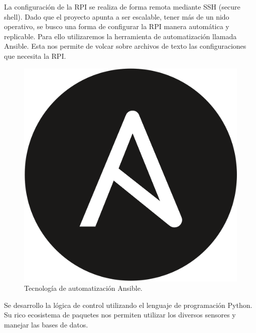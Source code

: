La configuración de la RPI se realiza de forma remota mediante SSH (secure shell).
Dado que el proyecto apunta a ser escalable, tener más de un nido operativo, se busco una forma de configurar la RPI manera automática y replicable. Para ello utilizaremos la herramienta  de automatización llamada Ansible. Esta nos permite de volcar sobre archivos de texto las configuraciones que necesita la RPI.

\begin{figure}[H]
	\centering
	\includegraphics[width=0.2\linewidth]{"../Ingenieria de Detalle/ImagenesIngenieria de Detalle/Ansible_logo"}
	\caption{Tecnología de automatización Ansible.}
	\label{fig:ansiblelogo}
\end{figure}


Se desarrollo la lógica de control utilizando el lenguaje de programación Python. Su rico ecosistema de paquetes nos permiten utilizar los diversos sensores y manejar las bases de datos.













